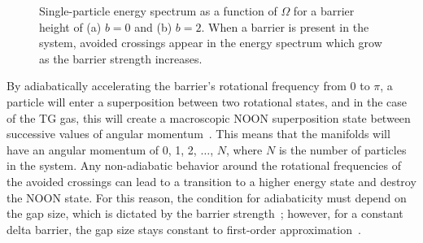 \begin{figure}

 \centering

\caption{Single-particle energy spectrum as a function of $\Omega$ for a barrier height of (a) $b = 0$ and (b) $b=2$.
When a barrier is present in the system, avoided crossings appear in the energy spectrum which grow as the barrier strength increases.}
\label{fig:avoid}
\end{figure}

By adiabatically accelerating the barrier's rotational frequency from 0 to $\pi$, a particle will enter a superposition between two rotational states, and in the case of the TG gas, this will create a macroscopic NOON superposition state between successive values of angular momentum~\cite{hallwood2010}.
This means that the manifolds will have an angular momentum of 0, 1, 2, $\ldots$, $N$, where $N$ is the number of particles in the system.
Any non-adiabatic behavior around the rotational frequencies of the avoided crossings can lead to a transition to a higher energy state and destroy the NOON state.
For this reason, the condition for adiabaticity must depend on the gap size, which is dictated by the barrier strength~\cite{nunnenkamp2008}; however, for a constant delta barrier, the gap size stays constant to first-order approximation~\cite{hallwood2007}.

